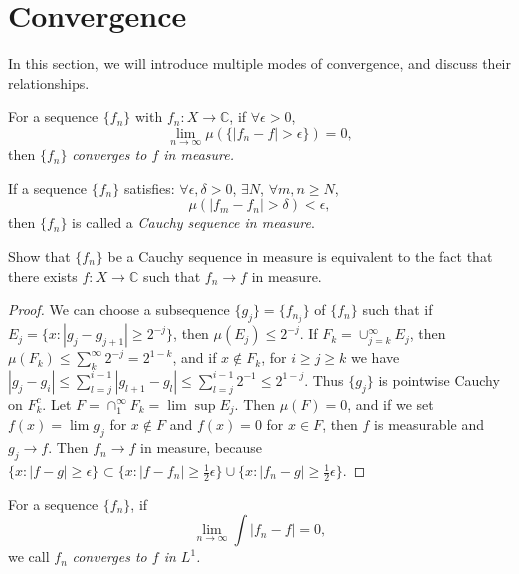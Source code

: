 \section{Convergence}
\begin{rem}
    In this section, we will introduce multiple modes of convergence, 
    and discuss their relationships.
\end{rem}
\begin{defn}
    \label{Defn:ConvergeInMeasure}
    For a sequence $\{f_{n}\}$ with $f_{n}:X\rightarrow\mathbb{C}$, 
    if $\forall\epsilon>0$, 
    \begin{displaymath}
        \lim_{n\rightarrow\infty}\mu(\{|f_n-f|>\epsilon\})=0,
    \end{displaymath}
    then $\{f_n\}$ \textit{converges to $f$ in measure.}
\end{defn}
\begin{defn}
    \label{Defn:CauchyInMeasure}
    If a sequence $\{f_{n}\}$ satisfies: $\forall\epsilon,\delta>0$, 
    $\exists N$, $\forall m,n\ge N$, 
    \begin{displaymath}
        \mu(|f_{m}-f_{n}|>\delta)<\epsilon,
    \end{displaymath}
    then $\{f_{n}\}$ is called a \textit{Cauchy sequence in measure}.
\end{defn}
\begin{exc}
    Show that $\{f_{n}\}$ be a Cauchy sequence in measure 
    is equivalent to the fact that 
    there exists $f:X\rightarrow\mathbb{C}$ such that 
    $f_{n}\rightarrow f$ in measure.
\end{exc}
\begin{proof}
    We can choose a subsequence $\{g_j\}=\{f_{n_j}\}$ of $\{f_n\}$
    such that if $E_j=\{x:|g_j-g_{j+1}|\geq2^{-j}\}$, then $\mu(E_j)
    \leq2^{-j}$. If $F_k=\cup_{j=k}^{\infty}E_j$, then $\mu(F_k)
    \leq\sum_{k}^{\infty}2^{-j}=2^{1-k}$, and if $x\notin F_k$, for
    $i\geq j\geq k$ we have $|g_j-g_i|\leq\sum_{l=j}^{i-1}|g_{l+1}-g_l|
    \leq\sum_{l=j}^{i-1}2^{-1}\leq2^{1-j}$. Thus $\{g_j\}$ is pointwise
    Cauchy on $F_k^c$. Let $F=\cap_{1}^{\infty}F_k=\lim\sup E_j$.
    Then $\mu(F)=0$, and if we set $f(x)=\lim g_j$ for $x\notin F$ 
    and $f(x)=0$ for $x\in F$, 
    then $f$ is measurable and $g_j\rightarrow f$.
    Then $f_n\rightarrow f$ in measure, because $\{x:|f-g|\geq\epsilon\}
    \subset\{x:|f-f_n|\geq\frac{1}{2}\epsilon\}\cup
    \{x:|f_n-g|\geq\frac{1}{2}\epsilon\}$.
\end{proof}
\begin{defn}
    \label{Defn:ConvergenceInL1}
    For a sequence $\{f_n\}$, if 
    \begin{displaymath}
        \lim_{n\rightarrow\infty}\int|f_n-f|=0,
    \end{displaymath}
    we call $f_{n}$ \textit{converges to $f$ in $L^{1}$.}
\end{defn}
